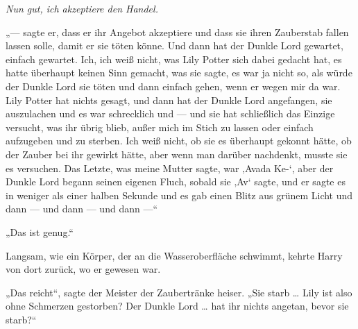\emph{Nun gut, ich akzeptiere den Handel.}

„— sagte er, dass er ihr Angebot akzeptiere und dass sie ihren Zauberstab fallen lassen solle, damit er sie töten könne. Und dann hat der Dunkle Lord gewartet, einfach gewartet. Ich, ich weiß nicht, was Lily Potter sich dabei gedacht hat, es hatte überhaupt keinen Sinn gemacht, was sie sagte, es war ja nicht so, als würde der Dunkle Lord sie töten und dann einfach gehen, wenn er wegen mir da war. Lily Potter hat nichts gesagt, und dann hat der Dunkle Lord angefangen, sie auszulachen und es war schrecklich und — und sie hat schließlich das Einzige versucht, was ihr übrig blieb, außer mich im Stich zu lassen oder einfach aufzugeben und zu sterben. Ich weiß nicht, ob sie es überhaupt gekonnt hätte, ob der Zauber bei ihr gewirkt hätte, aber wenn man darüber nachdenkt, musste sie es versuchen. Das Letzte, was meine Mutter sagte, war ‚Avada Ke-‘, aber der Dunkle Lord begann seinen eigenen Fluch, sobald sie ‚Av‘ sagte, und er sagte es in weniger als einer halben Sekunde und es gab einen Blitz aus grünem Licht und dann — und dann — und dann —“

„Das ist genug.“

Langsam, wie ein Körper, der an die Wasseroberfläche schwimmt, kehrte Harry von dort zurück, wo er gewesen war.

„Das reicht“, sagte der Meister der Zaubertränke heiser.
„Sie starb … Lily ist also ohne Schmerzen gestorben? Der Dunkle Lord … hat ihr nichts angetan, bevor sie starb?“

